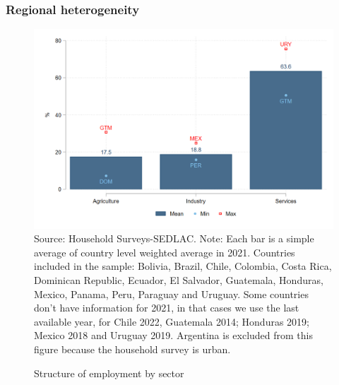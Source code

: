 \documentclass{beamer}
\begin{document}
\begin{frame}
\frametitle{Regional heterogeneity}
\begin{figure}[!htb]
        \justifying
        \caption{Structure of employment by sector}     
        \includegraphics[scale=.2]{latex/figures/Snapshot/Structure of employment and sector.png}
        \label{fig:sector}
       \footnotesize{Source: Household Surveys-SEDLAC.}
        \footnotesize{Note: Each bar is a simple average of country level weighted average in 2021. Countries included in the sample: Bolivia, Brazil, Chile, Colombia, Costa Rica, Dominican Republic, Ecuador, El Salvador, Guatemala, Honduras, Mexico, Panama, Peru, Paraguay and Uruguay. Some countries don’t have information for 2021, in that cases we use the last available year, for Chile 2022, Guatemala 2014; Honduras 2019; Mexico 2018 and Uruguay 2019. Argentina is excluded from this figure because the household survey is urban.}
\end{figure}
\end{frame}
\end{document}
